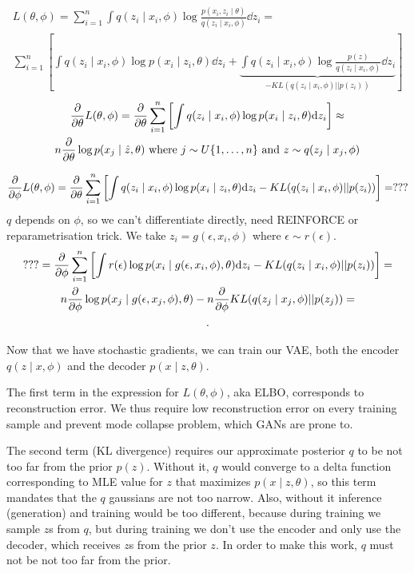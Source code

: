 \begin{multline*}
L(\theta, \phi) =
\sum_{i=1}^{n} \int q(z_i \mid x_i, \phi)
\log \frac{p(x_i, z_i \mid \theta)}{q(z_i \mid x_i, \phi)} \dd z_i =\\
\sum_{i=1}^{n} \left[ \int q(z_i \mid x_i, \phi) \log p(x_i \mid z_i, \theta) \dd z_i +
\underbrace{\int q(z_i \mid x_i, \phi) \log \frac{p(z)}{q(z_i \mid x_i, \phi)} \dd z_i}_{-KL(q(z_i \mid x_i, \phi) || p(z_i))} \right]
\end{multline*}
\begin{multline*}
\pdv{\theta} L(\theta, \phi) =
\pdv{\theta} \sum_{i=1}^{n} \left[ \int q(z_i \mid x_i, \phi) \log p(x_i \mid z_i, \theta) \dd z_i \right]
\approx \\
n \pdv{\theta} \log p(x_j \mid \hat{z}, \theta)
\text{ where } j \sim U \{1, \ldots, n\} \text{ and } z \sim q(z_j \mid x_j, \phi)
\end{multline*}

\[
\pdv{\phi} L(\theta, \phi) =
\pdv{\theta} \sum_{i=1}^{n} \left[
    \int q(z_i \mid x_i, \phi) \log p(x_i \mid z_i, \theta) \dd z_i
    -KL(q(z_i \mid x_i, \phi) || p(z_i))
\right] = ???
\]
$q$ depends on $\phi$, so we can't differentiate directly, need REINFORCE or reparametrisation trick.
We take $z_i = g(\epsilon, x_i, \phi)$ where $\epsilon \sim r(\epsilon)$.
\begin{multline*}
??? = \pdv{\phi} \sum_{i=1}^{n} \left[
    \int r(\epsilon) \log p(x_i \mid g(\epsilon, x_i, \phi), \theta) \dd z_i
    -KL(q(z_i \mid x_i, \phi) || p(z_i))
\right] =\\ n \pdv{\phi} \log p(x_j \mid g(\epsilon, x_j, \phi), \theta) 
- n \pdv{\phi} KL(q(z_j \mid x_j, \phi) || p(z_j)) =\\
.\end{multline*}

Now that we have stochastic gradients, we can train our VAE, both the encoder $q(z \mid x, \phi)$ and the decoder $p(x \mid z, \theta)$.

The first term in the expression for $L(\theta, \phi)$, aka ELBO, corresponds to reconstruction error.
We thus require low reconstruction error on every training sample and prevent mode collapse problem, which GANs are prone to.

The second term (KL divergence) requires our approximate posterior $q$ to be not too far from the prior $p(z)$.
Without it, $q$ would converge to a delta function corresponding to MLE value for $z$ that maximizes $p(x\mid z, \theta)$, so this term mandates that the $q$ gaussians are not too narrow.
Also, without it inference (generation) and training would be too different, because during training we sample $z$s from $q$, but during training we don't use the encoder and only use the decoder, which receives $z$s from the prior $z$.
In order to make this work, $q$ must not be not too far from the prior.

